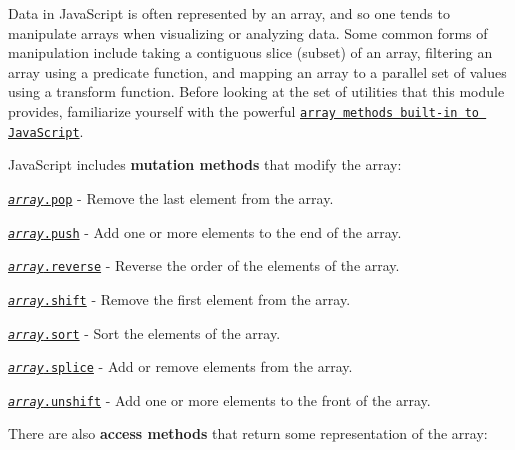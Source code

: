 Data in Java\+Script is often represented by an array, and so one tends to manipulate arrays when visualizing or analyzing data. Some common forms of manipulation include taking a contiguous slice (subset) of an array, filtering an array using a predicate function, and mapping an array to a parallel set of values using a transform function. Before looking at the set of utilities that this module provides, familiarize yourself with the powerful \href{https://developer.mozilla.org/en-US/docs/Web/JavaScript/Reference/Global_Objects/Array/prototype}{\tt array methods built-\/in to Java\+Script}.

Java\+Script includes {\bfseries mutation methods} that modify the array\+:


\begin{DoxyItemize}
\item \href{https://developer.mozilla.org/en-US/docs/Web/JavaScript/Reference/Global_Objects/Array/pop}{\tt {\itshape array}.pop} -\/ Remove the last element from the array.
\item \href{https://developer.mozilla.org/en-US/docs/Web/JavaScript/Reference/Global_Objects/Array/push}{\tt {\itshape array}.push} -\/ Add one or more elements to the end of the array.
\item \href{https://developer.mozilla.org/en-US/docs/Web/JavaScript/Reference/Global_Objects/Array/reverse}{\tt {\itshape array}.reverse} -\/ Reverse the order of the elements of the array.
\item \href{https://developer.mozilla.org/en-US/docs/Web/JavaScript/Reference/Global_Objects/Array/shift}{\tt {\itshape array}.shift} -\/ Remove the first element from the array.
\item \href{https://developer.mozilla.org/en-US/docs/Web/JavaScript/Reference/Global_Objects/Array/sort}{\tt {\itshape array}.sort} -\/ Sort the elements of the array.
\item \href{https://developer.mozilla.org/en-US/docs/Web/JavaScript/Reference/Global_Objects/Array/splice}{\tt {\itshape array}.splice} -\/ Add or remove elements from the array.
\item \href{https://developer.mozilla.org/en-US/docs/Web/JavaScript/Reference/Global_Objects/Array/unshift}{\tt {\itshape array}.unshift} -\/ Add one or more elements to the front of the array.
\end{DoxyItemize}

There are also {\bfseries access methods} that return some representation of the array\+:


